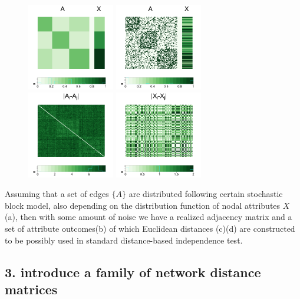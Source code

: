 \documentclass[12pt]{article}
\begin{document}
\begin{figure}[H]
	\centering
	\includegraphics[width=1.5in]{../Figure/pmat.png}
	\includegraphics[width=1.5in]{../Figure/Amat.png}
	\includegraphics[width=1.5in]{../Figure/distA.png}
	\includegraphics[width=1.5in]{../Figure/distX.png}
	\label{fig:matrics}
\end{figure}	

Assuming that a set of edges $\{ A \}$ are distributed following certain stochastic block model, also depending on the distribution function of nodal attributes $X$(a), then with some amount of noise we have a realized adjacency matrix and a set of attribute outcomes(b) of which Euclidean distances (c)(d) are constructed to be possibly used in standard distance-based independence test.

\subsection*{3. introduce a family of network distance matrices} 
\end{document}
